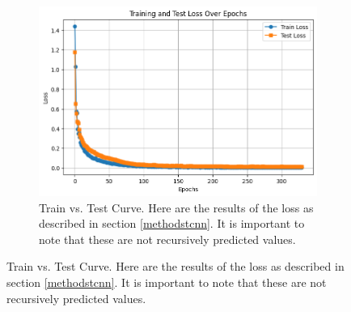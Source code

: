 \documentclass[conference]{IEEEtran}
\begin{document}
\begin{figure}[H]  %
    \begin{subfigure}{0.45\textwidth}  %
        \centering
        \includegraphics[scale=1]{pictures/train_test_curve.png}
        \caption{Train vs. Test Curve. Here are the results of the loss as described in section 
        \ref{methodstcnn}. It is important to note that these are not recursively predicted values.}
        \label{fig:train_test_curve}
    \end{subfigure}
\end{figure}

\newpage
\end{document}
